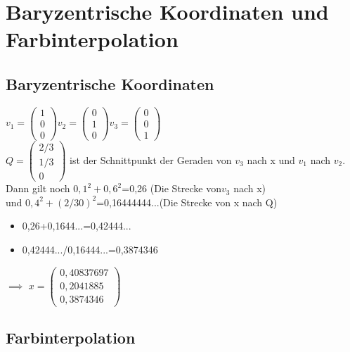 \documentclass[10pt,a4paper]{article}
\begin{document}
\section{Baryzentrische Koordinaten und Farbinterpolation}

\subsection{Baryzentrische Koordinaten}

$
v_1 =\begin{pmatrix}
1 \\
0 \\
0 
\end{pmatrix}
$$
v_2 =\begin{pmatrix}
0 \\
1 \\
0 
\end{pmatrix}
$$
v_3 =\begin{pmatrix}
	0 \\
	0 \\
	1 
\end{pmatrix}
$\\
$
Q =\begin{pmatrix}
2/3 \\
1/3 \\
0 
\end{pmatrix}
$
ist der Schnittpunkt der Geraden von $v_3$ nach x und $v_1$ nach $v_2$.
\\Dann gilt noch $0,1^2+0,6^2$=0,26 (Die Strecke von$v_3$ nach x)
\\und $0,4^2+(2/30)^2$=0,16444444...(Die Strecke von x nach Q)
\begin{itemize}
 \item  0,26+0,1644...=0,42444...
 \item  0,42444.../0,16444...=0,3874346
\end{itemize}
$\implies$
$
x =\begin{pmatrix}
0,40837697 \\
0,2041885 \\
0,3874346 
\end{pmatrix}
$



\subsection{Farbinterpolation}
\end{document}
